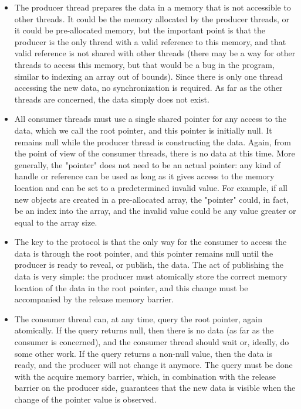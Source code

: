 \begin{itemize}
\item 
The producer thread prepares the data in a memory that is not accessible to other threads. It could be the memory allocated by the producer threads, or it could be pre-allocated memory, but the important point is that the producer is the only thread with a valid reference to this memory, and that valid reference is not shared with other threads (there may be a way for other threads to access this memory, but that would be a bug in the program, similar to indexing an array out of bounds). Since there is only one thread accessing the new data, no synchronization is required. As far as the other threads are concerned, the data simply does not exist.

\item 
All consumer threads must use a single shared pointer for any access to the data, which we call the root pointer, and this pointer is initially null. It remains null while the producer thread is constructing the data. Again, from the point of view of the consumer threads, there is no data at this time. More generally, the "pointer" does not need to be an actual pointer: any kind of handle or reference can be used as long as it gives access to the memory location and can be set to a predetermined invalid value. For example, if all new objects are created in a pre-allocated array, the "pointer" could, in fact, be an index into the array, and the invalid value could be any value greater or equal to the array size.

\item 
The key to the protocol is that the only way for the consumer to access the data is through the root pointer, and this pointer remains null until the producer is ready to reveal, or publish, the data. The act of publishing the data is very simple: the producer must atomically store the correct memory location of the data in the root pointer, and this change must be accompanied by the release memory barrier.

\item 
The consumer thread can, at any time, query the root pointer, again atomically. If the query returns null, then there is no data (as far as the consumer is concerned), and the consumer thread should wait or, ideally, do some other work. If the query returns a non-null value, then the data is ready, and the producer will not change it anymore. The query must be done with the acquire memory barrier, which, in combination with the release barrier on the producer side, guarantees that the new data is visible when the change of the pointer value is observed.
\end{itemize}

